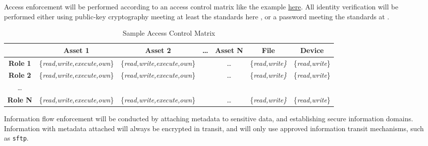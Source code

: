 \begin{policy}[AC-3]
  Access enforcement will be performed according to an access control matrix
  like the example \hyperref[control:matrix]{here}. All identity verification will be performed either using
  public-key cryptography meeting at least the standards here \fixme, or a
  password meeting the standards at \fixme.

  \begin{table}[h]
    \label{control:matrix}
    \begin{tabular}{ccccccc}
      & \textbf{Asset 1} & \textbf{Asset 2} & \ldots & \textbf{Asset N} &
      \textbf{File} & \textbf{Device} \\ \hline \hline
      \textbf{Role 1} & \{\emph{read,write,execute,own}\} &
      \{\emph{read,write,execute,own}\} & & \ldots & \{\emph{read,write\}} &
      \{\emph{read,write}\} \\ \hline
      \textbf{Role 2} & \{\emph{read,write,execute,own}\} &
      \{\emph{read,write,execute,own}\} & & \ldots & \{\emph{read,write\}} &
      \{\emph{read,write}\} \\ \hline
      \ldots \\ \hline
      \textbf{Role N} & \{\emph{read,write,execute,own}\} &
      \{\emph{read,write,execute,own}\} & & \ldots & \{\emph{read,write\}} &
      \{\emph{read,write}\} \\ \hline
    \end{tabular}
    \caption{Sample Access Control Matrix}
  \end{table}
\end{policy}

\begin{policy}[AC-4]
  Information flow enforcement will be conducted by attaching metadata to
  sensitive data, and establishing secure information domains. Information with
  metadata attached will always be encrypted in transit, and will only use
  approved information transit mechanisms, such as \texttt{sftp}.
\end{policy}

